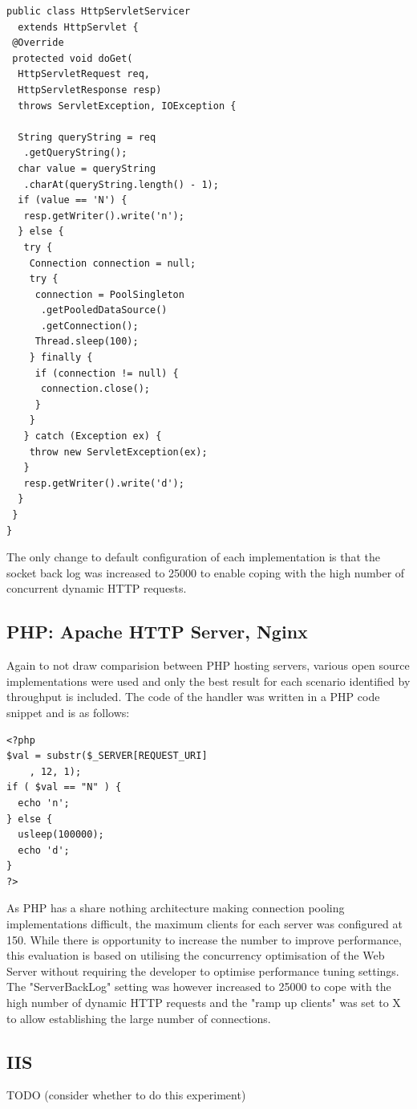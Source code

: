 \documentclass[conference]{ieee/IEEEtran}
\begin{document}
\begin{verbatim}   
public class HttpServletServicer 
  extends HttpServlet {
 @Override
 protected void doGet(
  HttpServletRequest req, 
  HttpServletResponse resp)
  throws ServletException, IOException {
		
  String queryString = req
   .getQueryString();
  char value = queryString
   .charAt(queryString.length() - 1);
  if (value == 'N') {
   resp.getWriter().write('n');
  } else {
   try {
    Connection connection = null;
    try {
     connection = PoolSingleton
      .getPooledDataSource()
      .getConnection();
     Thread.sleep(100);
    } finally {
     if (connection != null) {
      connection.close();
     }
    }
   } catch (Exception ex) {
    throw new ServletException(ex);
   }
   resp.getWriter().write('d');
  }
 }
}
\end{verbatim}
   
The only change to default configuration of each implementation is that the
socket back log was increased to 25000 to enable coping with the high number of
concurrent dynamic HTTP requests.

\subsection{PHP: Apache HTTP Server, Nginx}
Again to not draw comparision between PHP hosting servers, various open source
implementations were used and only the best result for each scenario identified
by throughput is included.  The code of the handler was written in a PHP code
snippet and is as follows:

\begin{verbatim}
<?php
$val = substr($_SERVER[REQUEST_URI]
    , 12, 1);
if ( $val == "N" ) {
  echo 'n';
} else {
  usleep(100000);
  echo 'd';
}
?>
\end{verbatim}

As PHP has a share nothing architecture making connection pooling
implementations difficult, the maximum clients for each server was configured
at 150.  While there is opportunity to increase the number to improve
performance, this evaluation is based on utilising the concurrency optimisation
of the Web Server without requiring the developer to optimise performance
tuning settings.  The "ServerBackLog" setting was however increased to 25000 to
cope with the high number of dynamic HTTP requests and the "ramp up clients"
was set to X to allow establishing the large number of connections.


\subsection{IIS}
TODO (consider whether to do this experiment)
\end{document}
